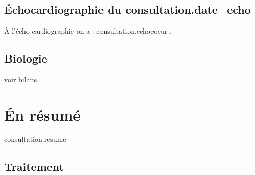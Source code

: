 \documentclass[headlines=6,headinclude=true,10pt]{scrartcl}
\begin{document}
{{{{{{{              {%
                
                \subsection{Échocardiographie du {{ consultation.date_echo }} }
                
                À l'écho cardiographie on a : {{consultation.echocoeur }}.\\
                
                {%
                  
                  \subsection{Biologie}

                  voir bilans. \\
                  
                  \section{Én résumé}
                  
                  {{ consultation.resume }}
                  
                  \subsection{Traitement}
                  
}}}}}}}}}
\end{document}
